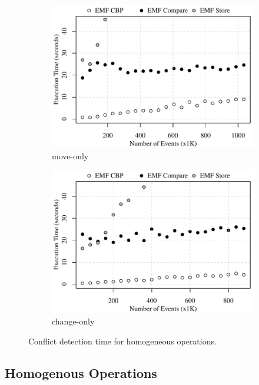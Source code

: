 \begin{figure}[ht]
\begin{subfigure}[t]{0.490\linewidth}
    \includegraphics[width=\linewidth]{move-conflict-time-events}
    \caption{move-only}
    \label{fig:move-conflict-time-events}
  \end{subfigure}
  \hfill
  \begin{subfigure}[t]{0.490\linewidth}
    \includegraphics[width=\linewidth]{change-conflict-time-events}
    \caption{change-only}
    \label{fig:change-conflict-time-events}
  \end{subfigure}
  \caption{Conflict detection time for homogeneous operations.}
  \label{fig:homgeneous_operation_time_events}
\end{figure}

\subsection{Homogenous Operations}
\label{sec:homogenous-operation_conflict}

